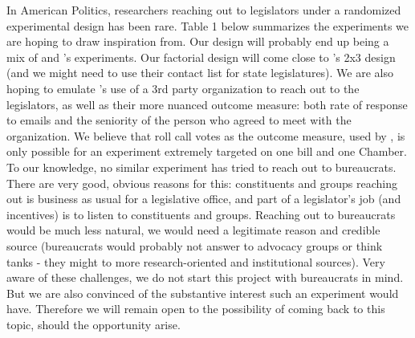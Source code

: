 \documentclass[12pt,final,fleqn]{article}
\theoremstyle{plain}
\begin{document}
\bigbreak
In American Politics, researchers reaching out to legislators under a randomized experimental design has been rare. Table 1 below summarizes the experiments we are hoping to draw inspiration from. Our design will probably end up being a mix of \citet{kalla2016campaign}  and  \citet{butler2011politicians}'s experiments. Our factorial design will come close to \citet{butler2011politicians}'s 2x3 design (and we might need to use their contact list for state legislatures). We are also hoping to emulate \citet{kalla2016campaign}'s use of a 3rd party organization to reach out to the legislators, as well as their more nuanced outcome measure: both rate of response to emails and the seniority of the person who agreed to meet with the organization. We believe that roll call votes as the outcome measure, used by \citet{bergan2009does}, is only possible for an experiment extremely targeted on one bill and one Chamber. 
\bigbreak
To our knowledge, no similar experiment has tried to reach out to bureaucrats. There are very good, obvious reasons for this: constituents and groups reaching out is business as usual for a legislative office, and part of a legislator's job (and incentives) is to listen to constituents and groups. Reaching out to bureaucrats would be much less natural, we would need a legitimate reason and credible source (bureaucrats would probably not answer to advocacy groups or think tanks - they might to more research-oriented and institutional sources). Very aware of these challenges, we do not start this project with bureaucrats in mind. But we are also convinced of the substantive interest such an experiment would have. Therefore we will remain open to the possibility of coming back to this topic, should the opportunity arise. 
\end{document}
